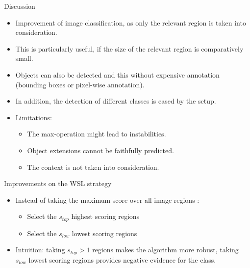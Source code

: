 \documentclass[xcolor=pdftex,dvipsnames,table]{beamer}
\begin{document}
\begin{frame}{Discussion}
\begin{itemize}
   \item Improvement of image classification, as only the relevant region is taken into consideration.
   \item This is particularly useful, if the size of the relevant region is comparatively small. 
   \item Objects can also be detected and this without expensive annotation (bounding boxes or pixel-wise annotation). 
   \item In addition, the detection of different classes is eased by the setup. 
   \item Limitations:
   \begin{itemize}
      \item The max-operation might lead to instabilities.
      \item Object extensions cannot be faithfully predicted. 
      \item The context is not taken into consideration. 
   \end{itemize}
\end{itemize}
\end{frame}

\begin{frame}{Improvements on the WSL strategy}
\begin{itemize}
   \item Instead of taking the maximum score over all image regions \cite{Durand2016}:
   \begin{itemize}
      \item Select the $s_{top}$ highest scoring regions
      \item Select the $s_{low}$ lowest scoring regions
   \end{itemize}
   \item Intuition: taking $s_{top}>1$ regions makes the algorithm more robust, taking $s_{low}$ lowest scoring regions provides negative evidence for the class. 
\end{itemize}
\end{frame}
\end{document}
